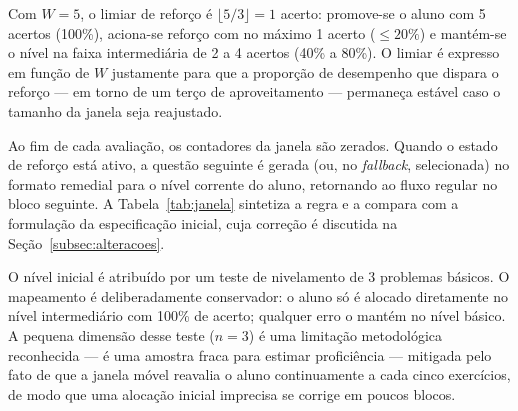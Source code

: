 \documentclass[10pt, a4paper, twocolumn]{article}
\begin{document}
Com $W = 5$, o limiar de reforço é $\lfloor 5/3 \rfloor = 1$ acerto: promove-se o
aluno com 5 acertos (100\%), aciona-se reforço com no máximo 1 acerto
($\leq 20\%$) e mantém-se o nível na faixa intermediária de 2 a 4 acertos (40\% a
80\%). O limiar é expresso em função de $W$ justamente para que a proporção de
desempenho que dispara o reforço --- em torno de um terço de aproveitamento ---
permaneça estável caso o tamanho da janela seja reajustado.

Ao fim de cada avaliação, os contadores da janela são zerados. Quando o estado de
reforço está ativo, a questão seguinte é gerada (ou, no \textit{fallback},
selecionada) no formato remedial para o nível corrente do aluno, retornando ao
fluxo regular no bloco seguinte. A Tabela~\ref{tab:janela} sintetiza a regra e a
compara com a formulação da especificação inicial, cuja correção é discutida na
Seção~\ref{subsec:alteracoes}.

\begin{table}[H]
\centering
\small
\caption{Regra da janela móvel de 5 exercícios}
\label{tab:janela}
\vspace{0.13cm}
\end{table}

O nível inicial é atribuído por um teste de nivelamento de 3 problemas básicos.
O mapeamento é deliberadamente conservador: o aluno só é alocado diretamente no
nível intermediário com 100\% de acerto; qualquer erro o mantém no nível básico.
A pequena dimensão desse teste ($n = 3$) é uma limitação metodológica
reconhecida --- é uma amostra fraca para estimar proficiência --- mitigada pelo
fato de que a janela móvel reavalia o aluno continuamente a cada cinco
exercícios, de modo que uma alocação inicial imprecisa se corrige em poucos
blocos.
\end{document}

